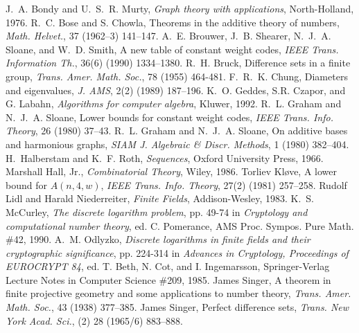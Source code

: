 \clearpage
\begin{thebibliography}{BSSS901}
J.~A. Bondy and U.~S.~R. Murty,
{\em Graph theory with applications},
North-Holland, 1976.
R.~C. Bose and S. Chowla,
Theorems in the additive theory of numbers,
{\em Math. Helvet.}, 37 (1962--3) 141--147.
A.~E. Brouwer, J.~B. Shearer, N.~J.~A. Sloane, and W.~D. Smith,
A new table of constant weight codes,
{\em IEEE Trans. Information Th.}, 36(6) (1990) 1334--1380.
R.~H. Bruck,
Difference sets in a finite group,
{\em Trans. Amer. Math. Soc.}, 78 (1955) 464-481.
F.~R.~K. Chung,
Diameters and eigenvalues,
{\em J. AMS}, 2(2) (1989) 187--196.
K.~O. Geddes, S.R. Czapor, and G. Labahn,
{\em Algorithms for computer algebra},
Kluwer, 1992.
R.~L. Graham and N.~J.~A. Sloane,
Lower bounds for constant weight codes,
{\em IEEE Trans. Info. Theory}, 26 (1980) 37--43.
R.~L. Graham and N.~J.~A. Sloane,
On additive bases and harmonious graphs,
{\em SIAM J. Algebraic \& Discr. Methods}, 1 (1980) 382--404.
H.~Halberstam and K.~F. Roth,
{\em Sequences},
Oxford University Press, 1966.
Marshall Hall, Jr.,
{\em Combinatorial Theory},
Wiley, 1986.
Torliev Kl{\o}ve,
A lower bound for $A(n,4,w)$,
{\em IEEE Trans. Info. Theory}, 27(2) (1981) 257--258.
Rudolf Lidl and Harald Niederreiter,
{\em Finite Fields},
Addison-Wesley, 1983.
K.~S. McCurley,
{\em The discrete logarithm problem},
pp. 49-74 in
{\em Cryptology and computational number theory},
ed. C. Pomerance, AMS Proc. Sympos. Pure Math. \#42, 1990.
A.~M. Odlyzko,
{\em Discrete logarithms in finite fields and their cryptographic
significance},
pp. 224-314 in
{\em Advances in Cryptology, Proceedings of EUROCRYPT 84},
ed. T. Beth, N. Cot, and I. Ingemarsson,
Springer-Verlag Lecture Notes in Computer Science \#209, 1985.
James Singer,
A theorem in finite projective geometry and some
applications to number theory,
{\em Trans. Amer. Math. Soc.}, 43 (1938) 377--385.
James Singer,
Perfect difference sets,
{\em Trans. New York Acad. Sci.}, (2) 28 (1965/6) 883--888.
\end{thebibliography}
 
